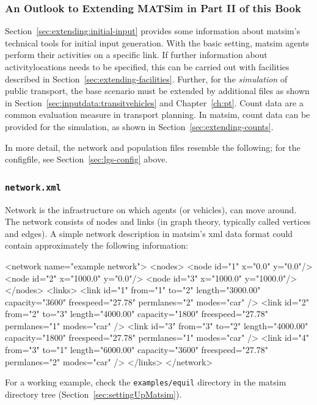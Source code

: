 \subsubsection{An Outlook to Extending MATSim in Part II of this Book}
Section~\ref{sec:extending:initial-input} provides some information about \gls{matsim}'s technical tools for initial input generation.
With the basic setting, \gls{matsim} agents perform their activities on a specific \gls{link}. If further information about \glspl{activitylocation} needs to be specified, this can be carried out with facilities described in Section~\ref{sec:extending-facilities}. Further, for the \emph{simulation} of public transport, the base scenario must be extended by additional files as shown in Section~\ref{sec:inputdata:transitvehicles} and Chapter~\ref{ch:pt}. Count data are a common evaluation measure in transport planning. In \gls{matsim}, count data can be provided for the simulation, as shown in Section~\ref{sec:extending-counts}. 
 
In more detail, the network and population files resemble the following; for the \gls{configfile}, see Section~\ref{sec:lgs-config} above.

\makeatletter
\newcommand\thefontsize{{The current font size is: \f@size pt\par}}
\makeatother

\subsubsection{\lstinline{network.xml}}
\label{sec:lgstarted-network-file}
 Network is the infrastructure on which agents (or vehicles), can move around. The network consists of \glspl{node} and \glspl{link} (in graph theory, typically called vertices and edges). A simple network description in \gls{matsim}'s \gls{xml} data format 
could contain approximately the following information:
\begin{xml}
<network name="example network"> 
   <nodes> 
      <node id="1" x="0.0" y="0.0"/> 
      <node id="2" x="1000.0" y="0.0"/> 
      <node id="3" x="1000.0" y="1000.0"/> 
   </nodes> 
   <links> 
      <link id="1" from="1" to="2" length="3000.00" capacity="3600" 
            freespeed="27.78" permlanes="2" modes="car" /> 
      <link id="2" from="2" to="3" length="4000.00" capacity="1800" 
            freespeed="27.78" permlanes="1" modes="car" /> 
      <link id="3" from="3" to="2" length="4000.00" capacity="1800" 
            freespeed="27.78" permlanes="1" modes="car" /> 
      <link id="4" from="3" to="1" length="6000.00" capacity="3600" 
            freespeed="27.78" permlanes="2" modes="car" /> 
   </links> 
</network>
\end{xml}
For a working example, check the \lstinline{examples/equil} directory in the \gls{matsim} directory tree (\cf Section~\ref{sec:settingUpMatsim}).

